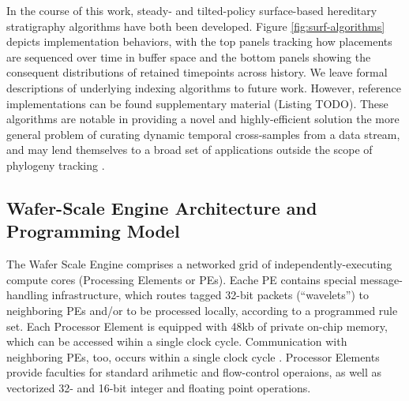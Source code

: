 

In the course of this work, steady- and tilted-policy surface-based hereditary stratigraphy algorithms have both been developed.
Figure \ref{fig:surf-algorithms} depicts implementation behaviors, with the top panels tracking how placements are sequenced over time in buffer space and the bottom panels showing the consequent distributions of retained timepoints across history.
We leave formal descriptions of underlying indexing algorithms to future work.
However, reference implementations can be found supplementary material (Listing TODO).
These algorithms are notable in providing a novel and highly-efficient solution the more general problem of curating dynamic temporal cross-samples from a data stream, and may lend themselves to a broad set of applications outside the scope of phylogeny tracking \citep{TODOCITEPREPRINT}.




\subsection{Wafer-Scale Engine Architecture and Programming Model}

The Wafer Scale Engine comprises a networked grid of independently-executing compute cores (Processing Elements or PEs).
Eache PE contains special message-handling infrastructure, which routes tagged 32-bit packets (``wavelets'') to neighboring PEs and/or to be processed locally, according to a programmed rule set.
Each Processor Element is equipped with 48kb of private on-chip memory, which can be accessed wihin a single clock cycle.
Communication with neighboring PEs, too, occurs within a single clock cycle \citep{TODO}.
Processor Elements provide faculties for standard arihmetic and flow-control operaions, as well as vectorized 32- and 16-bit integer and floating point operations.

